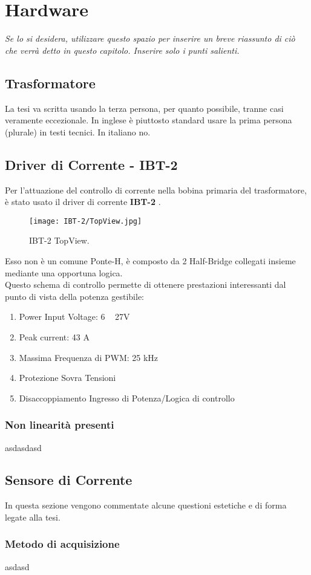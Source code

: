 \chapter{Hardware}\label{Hardware}

\begin{minipage}{12cm}\textit{Se lo si desidera, utilizzare questo spazio per inserire un breve riassunto di ci\`o che verr\`a detto in questo capitolo. Inserire solo i punti salienti.}
\end{minipage}

\vspace*{1cm}


\section{Trasformatore}\label{Trasformatore}

La tesi va scritta usando la terza persona, per quanto possibile, tranne casi veramente eccezionale. In inglese \`e piuttosto standard usare la prima persona (plurale) in testi tecnici. In italiano no.

\section{Driver di Corrente - IBT-2}\label{CurrentDriver}
Per l'attuazione del controllo di corrente nella bobina primaria del trasformatore, è stato usato il driver di corrente \textbf{IBT-2} \cite{IBT-2} .

\begin{figure}[h]
	\centering
	\texttt{[image: IBT-2/TopView.jpg]}
	\caption[Driver Motori IBT-2 TopView \& PinOut]{IBT-2 TopView.}
\end{figure}

Esso non è un comune Ponte-H, è composto da 2 Half-Bridge collegati insieme mediante una opportuna logica.\\
Questo schema di controllo permette di ottenere prestazioni interessanti dal punto di vista della potenza gestibile:
\begin{enumerate}
	\item Power Input Voltage: 6 ~ 27V
	\item Peak current: 43 A
	\item Massima Frequenza di PWM: 25 kHz
	\item Protezione Sovra Tensioni
	\item Disaccoppiamento Ingresso di Potenza/Logica di controllo
	
\end{enumerate}


\subsection{Non linearità presenti}
asdasdasd

\section{Sensore di Corrente}\label{CurrentSense}

In questa sezione vengono commentate alcune questioni estetiche e di
forma legate alla tesi.


\subsection{Metodo di acquisizione}
asdasd